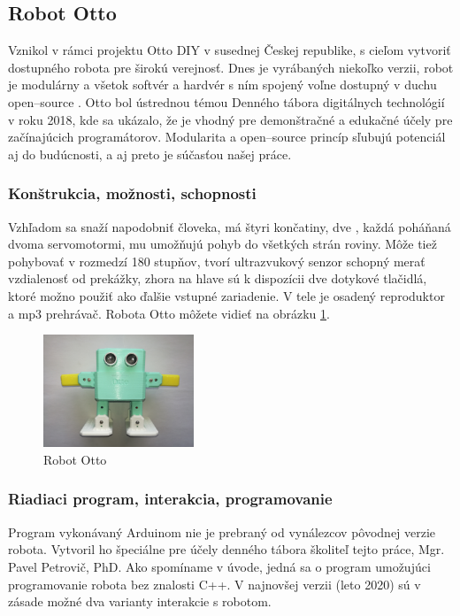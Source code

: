 \subsection{Robot Otto}
Vznikol v rámci projektu Otto DIY v susednej Českej republike, s cieľom vytvoriť dostupného robota pre širokú verejnosť. Dnes je vyrábaných niekoľko verzii, robot je modulárny a všetok softvér a hardvér s ním spojený voľne dostupný v duchu open--source \cite{OttoDIY}. Otto bol ústrednou témou Denného tábora digitálnych technológií v roku 2018, kde sa ukázalo, že je vhodný pre demonštračné a edukačné účely pre začínajúcich programátorov. Modularita a open--source princíp sľubujú potenciál aj do budúcnosti, a aj preto je súčasťou našej práce.

\subsubsection{Konštrukcia, možnosti, schopnosti}
Vzhľadom sa snaží napodobniť človeka, má štyri končatiny, dve , každá poháňaná dvoma servomotormi, mu umožňujú pohyb do všetkých strán roviny. Môže tiež pohybovať  v rozmedzí 180 stupňov,  tvorí ultrazvukový senzor schopný merať vzdialenosť od prekážky, zhora na hlave sú k dispozícii dve dotykové tlačidlá, ktoré možno použiť ako ďalšie vstupné zariadenie. V tele je osadený reproduktor a mp3 prehrávač. Robota Otto môžete vidieť na obrázku \ref{obr:otto}.

\begin{figure}
\centerline{\includegraphics[width=0.4\textwidth]{images/otto}}
\caption[Robot Otto]{Robot Otto}
\label{obr:otto}
\end{figure}

\subsubsection{Riadiaci program, interakcia, programovanie}
\label{subsub:otto-programovanie}
Program vykonávaný Arduinom nie je prebraný od vynálezcov pôvodnej verzie robota. Vytvoril ho špeciálne pre účely denného tábora školiteľ tejto práce, Mgr. Pavel Petrovič, PhD. Ako spomíname v úvode, jedná sa o program umožujúci programovanie robota bez znalosti C++. V najnovšej verzii (leto 2020) sú v zásade možné dva varianty interakcie s robotom.

